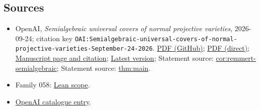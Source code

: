 \documentclass[11pt]{article}
\begin{document}
\subsection{Sources}
\begin{itemize}
\item OpenAI, \emph{Semialgebraic universal covers of normal projective varieties}, 2026-09-24; citation key \texttt{OAI:Semialgebraic-universal-covers-of-normal-projective-varieties-September-24-2026}. \href{https://github.com/openai/math/blob/adc7f1241b42e322a6451854ab7e4b4c146bf78a/preprints/Semialgebraic-universal-covers-of-normal-projective-varieties-September-24-2026/paper.pdf}{PDF (GitHub)}; \href{https://github.com/openai/math/raw/adc7f1241b42e322a6451854ab7e4b4c146bf78a/preprints/Semialgebraic-universal-covers-of-normal-projective-varieties-September-24-2026/paper.pdf}{PDF (direct)}; \href{https://github.com/openai/math/blob/adc7f1241b42e322a6451854ab7e4b4c146bf78a/preprints/Semialgebraic-universal-covers-of-normal-projective-varieties-September-24-2026/README.md}{Manuscript page and citation}; \href{https://github.com/openai/math/blob/main/preprints/Semialgebraic-universal-covers-of-normal-projective-varieties-September-24-2026/paper.pdf}{Latest version}; Statement source: \href{https://github.com/openai/math/blob/adc7f1241b42e322a6451854ab7e4b4c146bf78a/preprints/Semialgebraic-universal-covers-of-normal-projective-varieties-September-24-2026/build/main.tex\#L291}{cor:remmert-semialgebraic}; Statement source: \href{https://github.com/openai/math/blob/adc7f1241b42e322a6451854ab7e4b4c146bf78a/preprints/Semialgebraic-universal-covers-of-normal-projective-varieties-September-24-2026/build/main.tex\#L92}{thm:main}.
\item Family 058: \href{https://github.com/openai/math/blob/adc7f1241b42e322a6451854ab7e4b4c146bf78a/lean/docs/058.md}{Lean scope}.
\item \href{https://github.com/openai/math/blob/adc7f1241b42e322a6451854ab7e4b4c146bf78a/CONTENTS.md}{OpenAI catalogue entry}.
\end{itemize}
\end{document}
